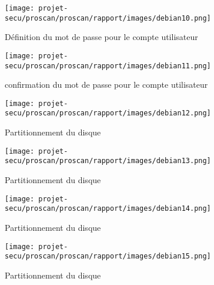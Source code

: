 \documentclass[11pt,a4paper,titlepage, oneside]{article}
\begin{document}
	 \newpage
                \begin{figure}[h]
                        \centering
                        \texttt{[image: projet-secu/proscan/proscan/rapport/images/debian10.png]}
                        \caption{Définition du mot de passe pour le compte utilisateur}
                \end{figure}

	
	\newpage
                \begin{figure}[h]
                        \centering
                        \texttt{[image: projet-secu/proscan/proscan/rapport/images/debian11.png]}
                        \caption{confirmation du mot de passe pour le compte utilisateur}
                \end{figure}

	 \newpage
                \begin{figure}[h]
                        \centering
                        \texttt{[image: projet-secu/proscan/proscan/rapport/images/debian12.png]}
                        \caption{Partitionnement du disque}
                \end{figure}

	 \newpage
                \begin{figure}[h]
                        \centering
                        \texttt{[image: projet-secu/proscan/proscan/rapport/images/debian13.png]}
                        \caption{Partitionnement du disque}
                \end{figure}


		 \newpage
                \begin{figure}[h]
                        \centering
                        \texttt{[image: projet-secu/proscan/proscan/rapport/images/debian14.png]}
                        \caption{Partitionnement du disque}
                \end{figure}

	\newpage
                \begin{figure}[h]
                        \centering
                        \texttt{[image: projet-secu/proscan/proscan/rapport/images/debian15.png]}
                        \caption{Partitionnement du disque}
                \end{figure}
\end{document}
